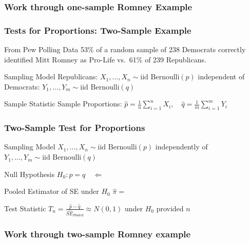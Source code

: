 \documentclass[handout]{beamer}
\begin{document}
\begin{frame}
	\frametitle{Work through one-sample Romney Example}
\end{frame}
\begin{frame}
	\frametitle{Tests for Proportions: Two-Sample Example}
	\begin{block}
		{From Pew Polling Data}
		53\% of a random sample of 238 Democrats correctly identified Mitt Romney as Pro-Life vs.\ 61\% of 239 Republicans.
	\end{block}
	\begin{block}
		{Sampling Model}
		Republicans: $X_1, \hdots, X_{n} \sim \mbox{iid Bernoulli}(p)$ independent of\\
		Democrats: $Y_1, \hdots,Y_{m} \sim \mbox{iid Bernoulli}(q)$ 
	\end{block}
	\begin{block}
		{Sample Statistic}
		Sample Proportions: $\displaystyle\widehat{p} = \frac{1}{n}\sum_{i=1}^{n} X_i, \quad\displaystyle\widehat{q} = \frac{1}{m}\sum_{i=1}^{m} Y_i$
	\end{block}

	\vspace{1em}

	\hfill \alert{}
\end{frame}
\begin{frame}
	\frametitle{Two-Sample Test for Proportions}
	\begin{block}
		{Sampling Model}
		$X_1, \hdots, X_n \sim \mbox{iid Bernoulli}(p)$ independently  of $Y_1, \hdots, Y_m \sim \mbox{iid Bernoulli}(q)$
	\end{block}
	\begin{block}
		{Null Hypothesis}
		$H_0\colon p = q \quad \Leftarrow \; $
	\end{block}
	\begin{block}
		{Pooled Estimator of SE under $H_0$}
		$\widehat{\pi} = $
	\end{block}
	\begin{block}
		{Test Statistic}
		$\displaystyle T_n = \frac{\widehat{p}- \widehat{q}}{\widehat{SE}_{Pooled}} \approx N(0,1)$ under $H_0$ provided $n$
	\end{block}
\end{frame}
\begin{frame}
	\frametitle{Work through two-sample Romney example}
\end{frame}
\end{document}
